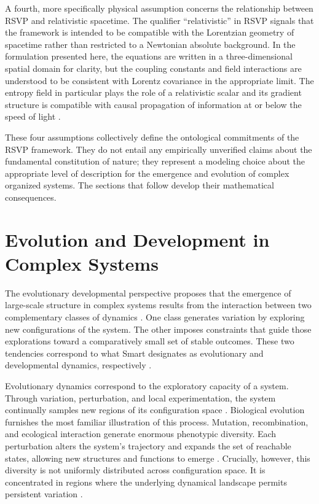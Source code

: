 \documentclass[12pt]{article}
\begin{document}
A fourth, more specifically physical assumption concerns the relationship between RSVP and relativistic spacetime. The qualifier ``relativistic'' in RSVP signals that the framework is intended to be compatible with the Lorentzian geometry of spacetime rather than restricted to a Newtonian absolute background. In the formulation presented here, the equations are written in a three-dimensional spatial domain for clarity, but the coupling constants and field interactions are understood to be consistent with Lorentz covariance in the appropriate limit. The entropy field in particular plays the role of a relativistic scalar and its gradient structure is compatible with causal propagation of information at or below the speed of light \cite{cover2006,barandes2023}.

These four assumptions collectively define the ontological commitments of the RSVP framework. They do not entail any empirically unverified claims about the fundamental constitution of nature; they represent a modeling choice about the appropriate level of description for the emergence and evolution of complex organized systems. The sections that follow develop their mathematical consequences.

\section{Evolution and Development in Complex Systems}
\label{sec:evodevo}

The evolutionary developmental perspective proposes that the emergence of large-scale structure in complex systems results from the interaction between two complementary classes of dynamics \cite{smart2009}. One class generates variation by exploring new configurations of the system. The other imposes constraints that guide those explorations toward a comparatively small set of stable outcomes. These two tendencies correspond to what Smart designates as evolutionary and developmental dynamics, respectively \cite{smart2009,smart2023}.

Evolutionary dynamics correspond to the exploratory capacity of a system. Through variation, perturbation, and local experimentation, the system continually samples new regions of its configuration space \cite{kauffman1993}. Biological evolution furnishes the most familiar illustration of this process. Mutation, recombination, and ecological interaction generate enormous phenotypic diversity. Each perturbation alters the system's trajectory and expands the set of reachable states, allowing new structures and functions to emerge \cite{kauffman1993,goodwin1994}. Crucially, however, this diversity is not uniformly distributed across configuration space. It is concentrated in regions where the underlying dynamical landscape permits persistent variation \cite{langton1990}.
\end{document}
